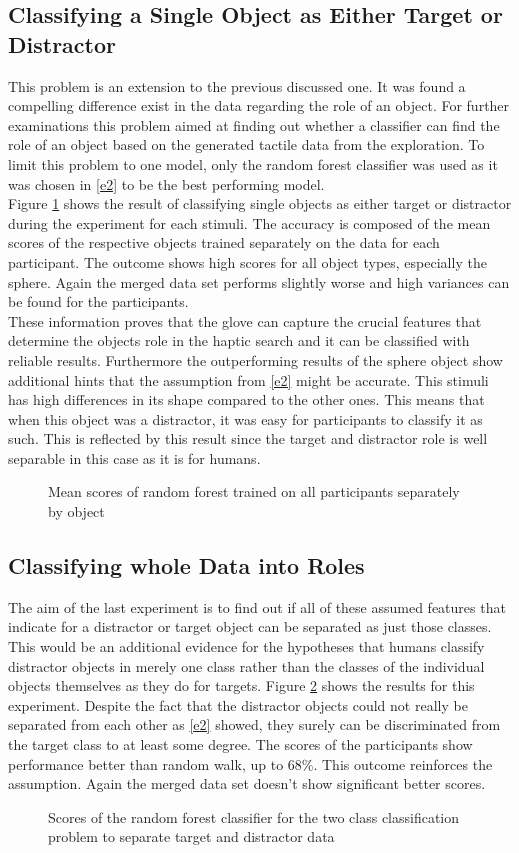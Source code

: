 \subsection{Classifying a Single Object as Either Target or Distractor}
This problem is an extension to the previous discussed one. It was found a compelling difference exist in the data regarding the role of an object. For further examinations this problem aimed at finding out whether a classifier can find the role of an object based on the generated tactile data from the exploration. To limit this problem to one model, only the random forest classifier was used as it was chosen in \ref{e2} to be the best performing model. \\
Figure \ref{tnt} shows the result of classifying single objects as either target or distractor during the experiment for each stimuli. The accuracy is composed of the mean scores of the respective objects trained separately on the data for each participant. The outcome shows high scores for all object types, especially the sphere. Again the merged data set performs slightly worse and high variances can be found for the participants.\\
These information proves that the glove can capture the crucial features that determine the objects role in the haptic search and it can be classified with reliable results. Furthermore the outperforming results of the sphere object show additional hints that the assumption from \ref{e2} might be accurate. This stimuli has high differences in its shape compared to the other ones. This means that when this object was a distractor, it was easy for participants to classify it as such. This is reflected by this result since the target and distractor role is well separable in this case as it is for humans. 

\begin{figure}[H]
	\caption{Mean scores of random forest trained on all participants separately by object}
	\label{tnt}
\end{figure}

\subsection{Classifying whole Data into Roles}
The aim of the last experiment is to find out if all of these assumed features that indicate for a distractor or target object can be separated as just those classes. This would be an additional evidence for the hypotheses that humans classify distractor objects in merely one class rather than the classes of the individual objects themselves as they do for targets. Figure \ref{tvd} shows the results for this experiment. Despite the fact that the distractor objects could not really be separated from each other as \ref{e2} showed, they surely can be discriminated from the target class to at least some degree. The scores of the participants show performance better than random walk, up to 68\%. This outcome reinforces the assumption. Again the merged data set doesn't show significant better scores.

\begin{figure}[H]
	\caption{Scores of the random forest classifier for the two class classification problem to separate target and distractor data}
	\label{tvd}
\end{figure}